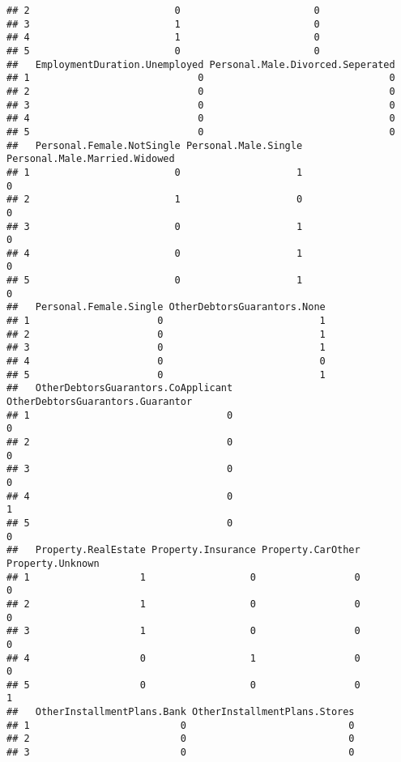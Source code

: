 \documentclass[
]{book}
\begin{document}
\begin{verbatim}
## 2                         0                       0
## 3                         1                       0
## 4                         1                       0
## 5                         0                       0
##   EmploymentDuration.Unemployed Personal.Male.Divorced.Seperated
## 1                             0                                0
## 2                             0                                0
## 3                             0                                0
## 4                             0                                0
## 5                             0                                0
##   Personal.Female.NotSingle Personal.Male.Single Personal.Male.Married.Widowed
## 1                         0                    1                             0
## 2                         1                    0                             0
## 3                         0                    1                             0
## 4                         0                    1                             0
## 5                         0                    1                             0
##   Personal.Female.Single OtherDebtorsGuarantors.None
## 1                      0                           1
## 2                      0                           1
## 3                      0                           1
## 4                      0                           0
## 5                      0                           1
##   OtherDebtorsGuarantors.CoApplicant OtherDebtorsGuarantors.Guarantor
## 1                                  0                                0
## 2                                  0                                0
## 3                                  0                                0
## 4                                  0                                1
## 5                                  0                                0
##   Property.RealEstate Property.Insurance Property.CarOther Property.Unknown
## 1                   1                  0                 0                0
## 2                   1                  0                 0                0
## 3                   1                  0                 0                0
## 4                   0                  1                 0                0
## 5                   0                  0                 0                1
##   OtherInstallmentPlans.Bank OtherInstallmentPlans.Stores
## 1                          0                            0
## 2                          0                            0
## 3                          0                            0

\end{verbatim}
\end{document}
